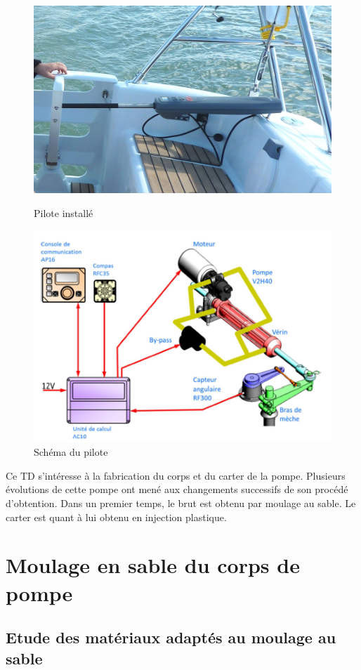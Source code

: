 \begin{figure}[h!]
 \begin{minipage}{0.49\linewidth}
\centering\includegraphics[width=0.8\linewidth]{img/pilote1.jpg}
\caption{Pilote installé}
\end{minipage}
 \hfill
  \begin{minipage}{0.49\linewidth}
\centering\includegraphics[width=0.8\linewidth]{img/pilote.png}
\caption{Schéma du pilote}
 \end{minipage}
\end{figure}

Ce TD s'intéresse à la fabrication du corps et du carter de la pompe. Plusieurs évolutions de cette pompe ont mené aux changements successifs de son procédé d'obtention. Dans un premier temps, le brut est obtenu par moulage au sable. Le carter est quant à lui obtenu en injection plastique.

\section{Moulage en sable du corps de pompe}

\subsection{Etude des matériaux adaptés au moulage au sable}

